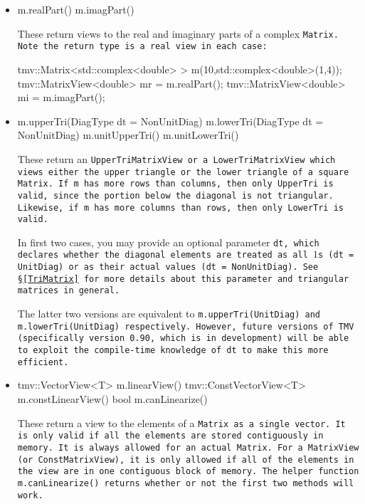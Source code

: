 \begin{itemize}
\item
\begin{tmvcode}
m.realPart()
m.imagPart()
\end{tmvcode}
These return views to the real and imaginary parts of a complex \tt{Matrix}.
Note the return type is a real view in each case:
\begin{tmvcode}
tmv::Matrix<std::complex<double> > m(10,std::complex<double>(1,4));
tmv::MatrixView<double> mr = m.realPart();
tmv::MatrixView<double> mi = m.imagPart();
\end{tmvcode}

\item
\begin{tmvcode}
m.upperTri(DiagType dt = NonUnitDiag)
m.lowerTri(DiagType dt = NonUnitDiag)
m.unitUpperTri()
m.unitLowerTri()
\end{tmvcode}
These return an \tt{UpperTriMatrixView} or a \tt{LowerTriMatrixView} which
views either the upper triangle or the lower triangle of a square \tt{Matrix}.
If \tt{m} has more rows than columns, then only \tt{UpperTri} is valid, since
the portion below the diagonal is not triangular.
Likewise, if \tt{m} has more columns than rows, then only \tt{LowerTri} is valid.

In first two cases, you may provide an optional parameter \tt{dt}, which
declares whether the diagonal elements are treated as all $1$s
(\tt{dt = UnitDiag}) or as their actual values (\tt{dt = NonUnitDiag}). 
See \S\ref{TriMatrix} for more details about this parameter and
triangular matrices in general.

The latter two versions are equivalent to \tt{m.upperTri(UnitDiag)} and 
\tt{m.lowerTri(UnitDiag)} respectively.  However, future versions of TMV
(specifically version 0.90, which is in development) will be able to exploit
the compile-time knowledge of \tt{dt} to make this more efficient.

\item
\begin{tmvcode}
tmv::VectorView<T> m.linearView()
tmv::ConstVectorView<T> m.constLinearView()
bool m.canLinearize()
\end{tmvcode}
These return a view to the elements of a \tt{Matrix} as a single vector.  It is only valid if all the elements are stored contiguously in memory.
It is always allowed for an actual \tt{Matrix}.  For a \tt{MatrixView} (or \tt{ConstMatrixView}), it is only allowed if all of the elements in the view are in one contiguous block of memory.  The helper function \tt{m.canLinearize()} returns whether or not the first two methods will work.

\end{itemize}

